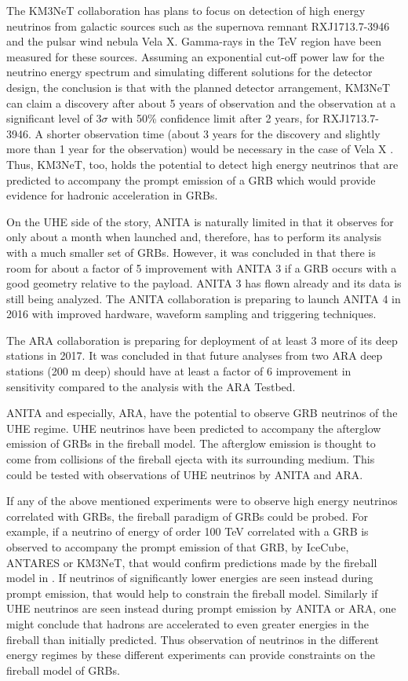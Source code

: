 \documentclass[12pt]{article}
\begin{document}
\begin{doublespace}
The KM3NeT collaboration has plans to focus on detection of high energy neutrinos from galactic sources such as the supernova remnant RXJ1713.7-3946 and the pulsar wind nebula Vela X. Gamma-rays in the TeV region have been measured for these sources. Assuming an exponential cut-off power law for the neutrino energy spectrum and simulating different solutions for the detector design, the conclusion is that with the planned detector arrangement, KM3NeT can claim a discovery after about 5 years of observation and the observation at a significant level of $3\sigma$ with 50\% confidence limit after 2 years, for RXJ1713.7-3946. A shorter observation time (about 3 years for the discovery and slightly more than 1 year for the observation) would be necessary in the case of Vela X \cite{km3net}. Thus, KM3NeT, too, holds the potential to detect high energy neutrinos that are predicted to accompany the prompt emission of a GRB which would provide evidence for hadronic acceleration in GRBs. 
\par
On the UHE side of the story, ANITA is naturally limited in that it observes for only about a month when launched and, therefore, has to perform its analysis with a much smaller set of GRBs. However, it was concluded in \cite{anita} that there is room for about a factor of 5 improvement with ANITA 3 if a GRB occurs with a good geometry relative to the payload. ANITA 3 has flown already and its data is still being analyzed. The ANITA collaboration is preparing to launch ANITA 4 in 2016 with improved hardware, waveform sampling and triggering techniques.\par
The ARA collaboration is preparing for deployment of at least 3 more of its deep stations in 2017. It was concluded in \cite{araproto} that future analyses from two ARA deep stations (200 m deep) should have at least a factor of 6 improvement in sensitivity compared to the analysis with the ARA Testbed.\par
ANITA and especially, ARA, have the potential to observe GRB neutrinos of the UHE regime. UHE neutrinos have been predicted to accompany the afterglow emission of GRBs in the fireball model. The afterglow emission is thought to come from collisions of the fireball ejecta with its surrounding medium. This could be tested with observations of UHE neutrinos by ANITA and ARA.\par
If any of the above mentioned experiments were to observe high energy neutrinos correlated with GRBs, the fireball paradigm of GRBs could be probed. For example, if a neutrino of energy of order 100 TeV correlated with a GRB is observed to accompany the prompt emission of that GRB, by IceCube, ANTARES or KM3NeT, that would confirm predictions made by the fireball model in \cite{firstcalc}. If neutrinos of significantly lower energies are seen instead during prompt emission, that would help to constrain the fireball model. Similarly if UHE neutrinos are seen instead during prompt emission by ANITA or ARA, one might conclude that hadrons are accelerated to even greater energies in the fireball than initially predicted. Thus observation of neutrinos in the different energy regimes by these different experiments can provide constraints on the fireball model of GRBs.\par

\end{doublespace}
\end{document}
